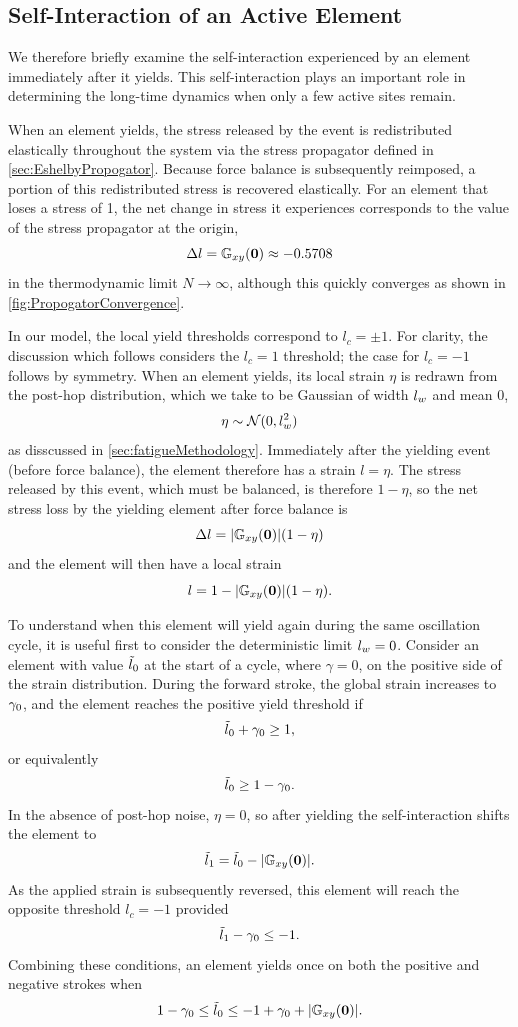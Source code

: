 \subsection*{Self-Interaction of an Active Element}

We therefore briefly examine the self-interaction experienced by an element immediately after it yields. This self-interaction plays an important role in determining the long-time dynamics when only a few active sites remain.

When an element yields, the stress released by the event is redistributed elastically throughout the system via the stress propagator defined in \cref{sec:EshelbyPropogator}. Because force balance is subsequently reimposed, a portion of this redistributed stress is recovered elastically. For an element that loses a stress of 1, the net change in stress it experiences corresponds to the value of the stress propagator at the origin, 
\[
\Delta l = \mathbb{G}_{xy}(\bm{0}) \approx -0.5708 
\]
in the thermodynamic limit $N\to\infty$, although this quickly converges as shown in \cref{fig:PropogatorConvergence}.

In our model, the local yield thresholds correspond to $l_c=\pm 1$. For clarity, the discussion which follows considers the $l_c=1$ threshold; the case for $l_c=-1$ follows by symmetry. When an element yields, its local strain $\eta$ is redrawn from the post-hop distribution, which we take to be Gaussian of width $l_w$ and mean $0$,
\[
 \eta \sim \mathcal{N}(0,l_w^2)
\]
as disscussed in \cref{sec:fatigueMethodology}. Immediately after the yielding event (before force balance), the element therefore has a strain $l=\eta$. The stress released by this event, which must be balanced, is therefore $1-\eta$, so the net stress loss by the yielding element after force balance is
\[
\Delta l = |\mathbb{G}_{xy}(\bm{0})|(1-\eta)
\]
and the element will then have a local strain
\[
l = 1 - |\mathbb{G}_{xy}(\bm{0})|(1-\eta).
\]

To understand when this element will yield again during the same oscillation cycle, it is useful first to consider the deterministic limit $l_w=0$. Consider an element with value $\tilde{l}_0$ at the start of a cycle, where $\gamma=0$, on the positive side of the strain distribution. During the forward stroke, the global strain increases to $\gamma_0$, and the element reaches the positive yield threshold if
\[
    \tilde{l}_0+\gamma_0 \geq 1,
\]
or equivalently
\[
    \tilde{l}_0 \geq 1-\gamma_0.
\]
In the absence of post-hop noise, $\eta=0$, so after yielding the self-interaction shifts the element to
\[
    \tilde{l}_1=\tilde{l}_0-|\mathbb{G}_{xy}(\bm{0})|.
\]
As the applied strain is subsequently reversed, this element will reach the opposite threshold $l_c=-1$ provided
\[
    \tilde{l}_1-\gamma_0\leq -1.
\]
Combining these conditions, an element yields once on both the positive and negative strokes when
\[
    1-\gamma_0
    \leq \tilde{l}_0
    \leq -1+\gamma_0+|\mathbb{G}_{xy}(\bm{0})|.
\]

